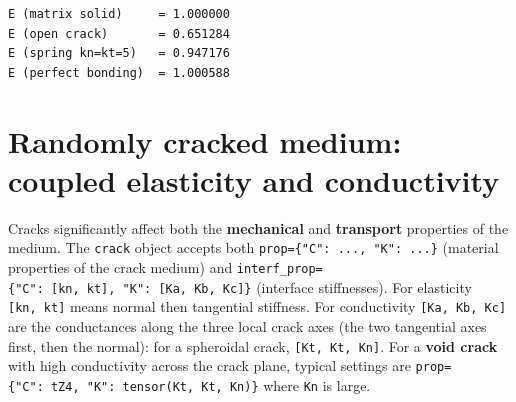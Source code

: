 \documentclass[
  a4paper,
  numbers=noendperiod,
  DIV=12]{scrreprt}
\begin{document}
\begin{verbatim}
E (matrix solid)     = 1.000000
E (open crack)       = 0.651284
E (spring kn=kt=5)   = 0.947176
E (perfect bonding)  = 1.000588
\end{verbatim}

\section{Randomly cracked medium: coupled elasticity and
conductivity}\label{randomly-cracked-medium-coupled-elasticity-and-conductivity}

Cracks significantly affect both the \textbf{mechanical} and
\textbf{transport} properties of the medium. The \texttt{crack} object
accepts both \texttt{prop=\{"C":\ ...,\ "K":\ ...\}} (material
properties of the crack medium) and
\texttt{interf\_prop=\{"C":\ {[}kn,\ kt{]},\ "K":\ {[}Ka,\ Kb,\ Kc{]}\}}
(interface stiffnesses). For elasticity \texttt{{[}kn,\ kt{]}} means
normal then tangential stiffness. For conductivity
\texttt{{[}Ka,\ Kb,\ Kc{]}} are the conductances along the three local
crack axes (the two tangential axes first, then the normal): for a
spheroidal crack, \texttt{{[}Kt,\ Kt,\ Kn{]}}. For a \textbf{void crack}
with high conductivity across the crack plane, typical settings are
\texttt{prop=\{"C":\ tZ4,\ "K":\ tensor(Kt,\ Kt,\ Kn)\}} where
\texttt{Kn} is large.
\end{document}
